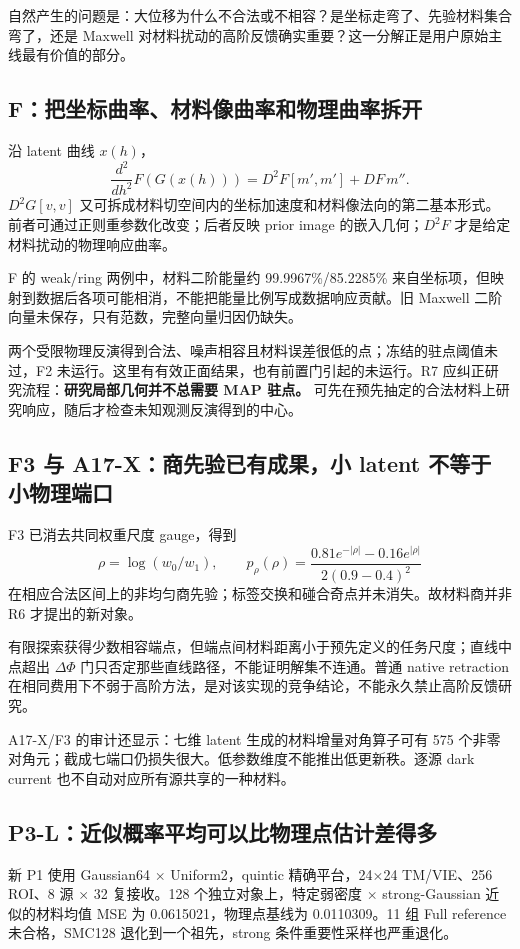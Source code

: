 自然产生的问题是：大位移为什么不合法或不相容？是坐标走弯了、先验材料集合弯了，还是 Maxwell 对材料扰动的高阶反馈确实重要？这一分解正是用户原始主线最有价值的部分。

\subsection{F：把坐标曲率、材料像曲率和物理曲率拆开}
沿 latent 曲线 $x(h)$，
\[
\frac{d^2}{dh^2}F(G(x(h)))
=
D^2F[m',m']+DF\,m''.
\]
$D^2G[v,v]$ 又可拆成材料切空间内的坐标加速度和材料像法向的第二基本形式。前者可通过正则重参数化改变；后者反映 prior image 的嵌入几何；$D^2F$ 才是给定材料扰动的物理响应曲率。

F 的 weak/ring 两例中，材料二阶能量约 99.9967\%/85.2285\% 来自坐标项，但映射到数据后各项可能相消，不能把能量比例写成数据响应贡献。旧 Maxwell 二阶向量未保存，只有范数，完整向量归因仍缺失。

两个受限物理反演得到合法、噪声相容且材料误差很低的点；冻结的驻点阈值未过，F2 未运行。这里有有效正面结果，也有前置门引起的未运行。R7 应纠正研究流程：\textbf{研究局部几何并不总需要 MAP 驻点。} 可先在预先抽定的合法材料上研究响应，随后才检查未知观测反演得到的中心。

\subsection{F3 与 A17-X：商先验已有成果，小 latent 不等于小物理端口}
F3 已消去共同权重尺度 gauge，得到
\[
\rho=\log(w_0/w_1),\qquad
p_\rho(\rho)=
\frac{0.81e^{-|\rho|}-0.16e^{|\rho|}}
{2(0.9-0.4)^2}
\]
在相应合法区间上的非均匀商先验；标签交换和碰合奇点并未消失。故材料商并非 R6 才提出的新对象。

有限探索获得少数相容端点，但端点间材料距离小于预先定义的任务尺度；直线中点超出 $\Delta\Phi$ 门只否定那些直线路径，不能证明解集不连通。普通 native retraction 在相同费用下不弱于高阶方法，是对该实现的竞争结论，不能永久禁止高阶反馈研究。

A17-X/F3 的审计还显示：七维 latent 生成的材料增量对角算子可有 575 个非零对角元；截成七端口仍损失很大。低参数维度不能推出低更新秩。逐源 dark current 也不自动对应所有源共享的一种材料。

\subsection{P3-L：近似概率平均可以比物理点估计差得多}
新 P1 使用 Gaussian64 $\times$ Uniform2，quintic 精确平台，24$\times$24 TM/VIE、256 ROI、8 源 $\times$ 32 复接收。128 个独立对象上，特定弱密度 $\times$ strong-Gaussian 近似的材料均值 MSE 为 0.0615021，物理点基线为 0.0110309。11 组 Full reference 未合格，SMC128 退化到一个祖先，strong 条件重要性采样也严重退化。

